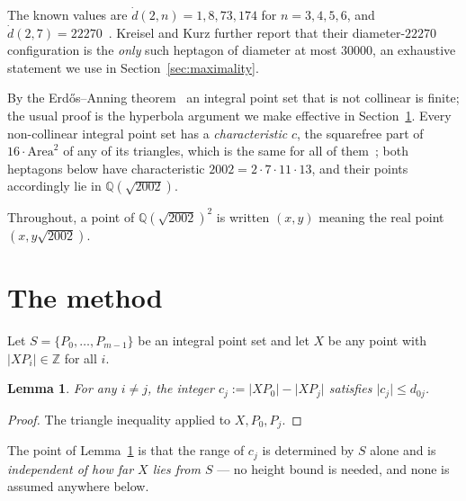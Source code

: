 \documentclass[11pt,reqno]{amsart}
\theoremstyle{plain}
\newtheorem{lemma}[theorem]{Lemma}
\numberwithin{equation}{section}
\newcommand{\dgp}{\dot{d}}
\begin{document}
The known values are $\dgp(2,n)=1,8,73,174$ for $n=3,4,5,6$, and $\dgp(2,7)=22270$~\cite{KK08}.
Kreisel and Kurz further report that their diameter-$22270$ configuration is the \emph{only} such
heptagon of diameter at most $30000$, an exhaustive statement we use in Section~\ref{sec:maximality}.

By the Erd\H{o}s--Anning theorem~\cite{AE45} an integral point set that is not collinear is finite;
the usual proof is the hyperbola argument we make effective in Section~\ref{sec:method}. Every
non-collinear integral point set has a \emph{characteristic} $c$, the squarefree part of
$16\cdot\mathrm{Area}^2$ of any of its triangles, which is the same for all of them~\cite{Kem88};
both heptagons below have characteristic $2002=2\cdot 7\cdot 11\cdot 13$, and their points
accordingly lie in $\mathbb{Q}(\sqrt{2002})$.

Throughout, a point of $\mathbb{Q}(\sqrt{2002})^2$ is written $(x,y)$ meaning the real point
$(x,y\sqrt{2002})$.

\section{The method}\label{sec:method}

Let $S=\{P_0,\dots,P_{m-1}\}$ be an integral point set and let $X$ be any point with $\lvert
XP_i\rvert\in\mathbb{Z}$ for all $i$.

\begin{lemma}\label{lem:range}
For any $i\neq j$, the integer $c_j:=\lvert XP_0\rvert-\lvert XP_j\rvert$ satisfies $\lvert
c_j\rvert\le d_{0j}$.
\end{lemma}

\begin{proof}
The triangle inequality applied to $X,P_0,P_j$.
\end{proof}

The point of Lemma~\ref{lem:range} is that the range of $c_j$ is determined by $S$ alone and is
\emph{independent of how far $X$ lies from $S$} --- no height bound is needed, and none is assumed
anywhere below.
\end{document}
